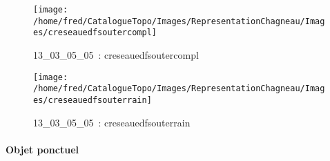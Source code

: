 \documentclass[12pt,titlepage]{book}
\begin{document}
\begin{figure}[h!]
  \begin{minipage}[t]{3cm}
    \begin{center}
      \texttt{[image: /home/fred/CatalogueTopo/Images/RepresentationChagneau/Images/creseauedfsoutercompl]}
      \caption[~13\_03\_05\_05]{\small{13\_03\_05\_05~:} \tiny{creseauedfsoutercompl}}\label{creseauedfsoutercompl}
    \end{center}
  \end{minipage}
  \begin{minipage}[t]{3cm}
    \begin{center}
      \texttt{[image: /home/fred/CatalogueTopo/Images/RepresentationChagneau/Images/creseauedfsouterrain]}
      \caption[~13\_03\_05\_05]{\small{13\_03\_05\_05~:} \tiny{creseauedfsouterrain}}\label{creseauedfsouterrain}
    \end{center}
  \end{minipage}
\end{figure}


\paragraph{Objet ponctuel}
\noindent
\vspace{\baselineskip}
\end{document}
